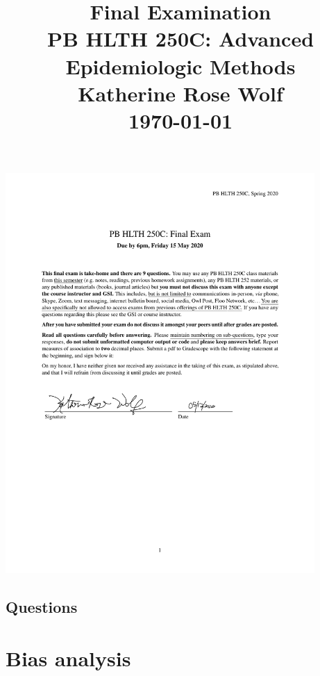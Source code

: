 \documentclass[
  11pt,
]{article}
\title{\fontsize{15pt}{5pt}\selectfont\textbf{Final Examination}\\
\vspace{.3cm}\textbf{PB HLTH 250C: Advanced Epidemiologic Methods}\\
\vspace{.2cm}\textbf{Katherine Rose Wolf}\\
\vspace{.3cm}\textbf{\today}}
\author{}
\date{\vspace{-2.5em}}
\begin{document}
\maketitle

\pagestyle{plain}

\begin{center}

\includegraphics[height=6in]{signature_page}

\end{center}

\newpage

\begin{center}

\section{Questions}

\end{center}

\section{Bias analysis}
\end{document}
